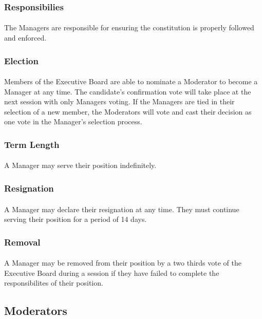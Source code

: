 \documentclass[10pt,a4paper]{article}
\begin{document}
\subsubsection{Responsibilies}
\paragraph{}
The Managers are responsible for ensuring the constitution is properly followed and enforced.
\subsubsection{Election}
\paragraph{}
Members of the Executive Board are able to nominate a Moderator to become a Manager at any time. The candidate's confirmation vote will take place at the next session with only Managers voting. If the Managers are tied in their selection of a new member, the Moderators will vote and cast their decision as one vote in the Manager's selection process.
\subsubsection{Term Length}
\paragraph{}
A Manager may serve their position indefinitely.
\subsubsection{Resignation}
\paragraph{}
A Manager may declare their resignation at any time. They must continue serving their position for a period of 14 days.
\subsubsection{Removal}
\paragraph{}
A Manager may be removed from their position by a two thirds vote of the Executive Board during a session if they have failed to complete the responsibilites of their position.
\subsection{Moderators}
\end{document}
